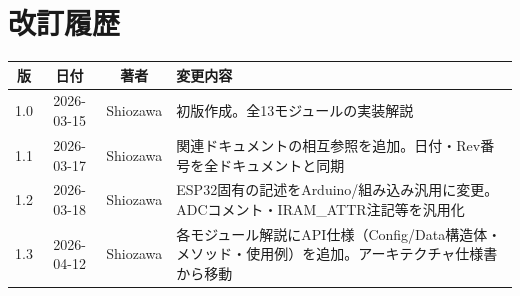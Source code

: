 \section*{改訂履歴}

\begin{tabularx}{\textwidth}{c c c X}
\toprule
\textbf{版} & \textbf{日付} & \textbf{著者} & \textbf{変更内容} \\
\midrule
1.0 & 2026-03-15 & Shiozawa & 初版作成。全13モジュールの実装解説 \\
1.1 & 2026-03-17 & Shiozawa & 関連ドキュメントの相互参照を追加。日付・Rev番号を全ドキュメントと同期 \\
1.2 & 2026-03-18 & Shiozawa & ESP32固有の記述をArduino/組み込み汎用に変更。ADCコメント・IRAM\_ATTR注記等を汎用化 \\
1.3 & 2026-04-12 & Shiozawa & 各モジュール解説にAPI仕様（Config/Data構造体・メソッド・使用例）を追加。アーキテクチャ仕様書から移動 \\
\bottomrule
\end{tabularx}
